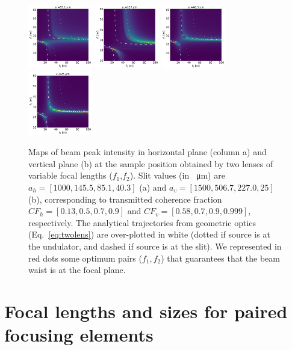 \documentclass[9pt,twocolumn,twoside]{osajnl}
\begin{document}
\begin{figure}[htbp]
\includegraphics[width=0.25\textwidth]{figures/H_1.png}
\includegraphics[width=0.25\textwidth]{figures/V_1.png}
\includegraphics[width=0.25\textwidth]{figures/H_0.png}
\includegraphics[width=0.25\textwidth]{figures/V_0.png}
\caption{
        \label{fig:f1f2map}
    Maps of beam peak intensity in horizontal plane (column a) and vertical plane (b) at the sample position obtained by two lenses of variable focal lengths ($f_1$,$f_2$).
    Slit values (in \SI{}{\micro\meter}) are $a_h=[1000, 145.5, 85.1, 40.3]$ (a) and $a_v=[1500, 506.7, 227.0, 25]$ (b), corresponding to transmitted coherence fraction
    $CF_h=[0.13, 0.5, 0.7, 0.9]$ and
    $CF_v=[0.58, 0.7, 0.9, 0.999]$, respectively.
    The analytical trajectories from geometric optics (Eq.~\ref{eq:twolens}) are over-plotted in white (dotted if source is at the undulator, and dashed if source is at the slit). We represented in red dots some optimum pairs ($f_1,f_2$) that guarantees that the beam waist is at the focal plane.
    }
\end{figure}

\section{Focal lengths and sizes for paired focusing elements}
\end{document}
